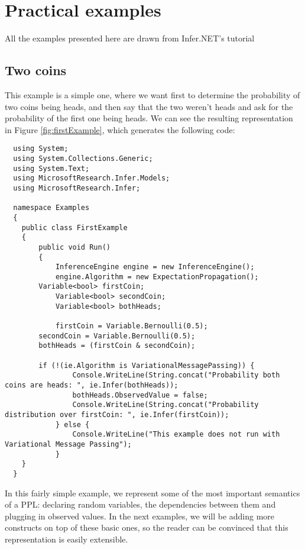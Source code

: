 \chapter{Practical examples}\label{chap:chap4}

All the examples presented here are drawn from Infer.NET's tutorial
\cite{InferNET14t}

\section{Two coins}

This example is a simple one, where we want first to determine the probability of
two coins being heads, and then say that the two weren't heads and ask for the
probability of the first one being heads.
We can see the resulting representation in Figure \ref{fig:firstExample}, which generates the following code:

\begin{lstlisting}
  using System;
  using System.Collections.Generic;
  using System.Text;
  using MicrosoftResearch.Infer.Models;
  using MicrosoftResearch.Infer;

  namespace Examples
  {
  	public class FirstExample
  	{
  		public void Run()
  		{
  			InferenceEngine engine = new InferenceEngine();
  			engine.Algorithm = new ExpectationPropagation();
        Variable<bool> firstCoin;
  			Variable<bool> secondCoin;
  			Variable<bool> bothHeads;

  			firstCoin = Variable.Bernoulli(0.5);
        secondCoin = Variable.Bernoulli(0.5);
        bothHeads = (firstCoin & secondCoin);

        if (!(ie.Algorithm is VariationalMessagePassing)) {
  				Console.WriteLine(String.concat("Probability both coins are heads: ", ie.Infer(bothHeads));
  				bothHeads.ObservedValue = false;
  				Console.WriteLine(String.concat("Probability distribution over firstCoin: ", ie.Infer(firstCoin));
  			} else {
  				Console.WriteLine("This example does not run with Variational Message Passing");
    		}
  	}
  }
\end{lstlisting}

In this fairly simple example, we represent some of the most important semantics
of a PPL: declaring random variables, the dependencies between them and plugging
in observed values. In the next examples, we will be adding more constructs on
top of these basic ones, so the reader can be convinced that this representation
is easily extensible.

